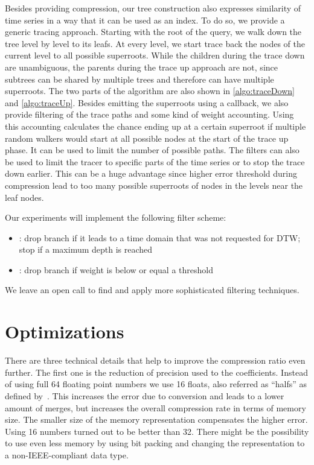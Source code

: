 Besides providing compression, our tree construction also expresses similarity of time series in a way that it can be used as an index. To do so, we provide a generic tracing approach. Starting with the root of the query, we walk down the tree level by level to its leafs. At every level, we start trace back the nodes of the current level to all possible superroots. While the children during the trace down are unambiguous, the parents during the trace up approach are not, since subtrees can be shared by multiple trees and therefore can have multiple superroots. The two parts of the algorithm are also shown in \autoref{algo:traceDown} and \autoref{algo:traceUp}. Besides emitting the superroots using a callback, we also provide filtering of the trace paths and some kind of weight accounting. Using this accounting calculates the chance ending up at a certain superroot if multiple random walkers would start at all possible nodes at the start of the trace up phase. It can be used to limit the number of possible paths. The filters can also be used to limit the tracer to specific parts of the time series or to stop the trace down earlier. This can be a huge advantage since higher error threshold during compression lead to too many possible superroots of nodes in the levels near the leaf nodes.

Our experiments will implement the following filter scheme:

\begin{itemize}
    \item {}: drop branch if it leads to a time domain that was not requested for DTW\@; stop if a maximum depth is reached
    \item {}: drop branch if weight is below or equal a threshold
\end{itemize}

We leave an open call to find and apply more sophisticated filtering techniques.



\section{Optimizations}
\label{sec:algorithm:opt}

There are three technical details that help to improve the compression ratio even further. The first one is the reduction of precision used to the coefficients. Instead of using full \SI{64}{\bit} floating point numbers we use \SI{16}{\bit} floats, also referred as \enquote{halfs} as defined by~\cite{ieee_float}. This increases the error due to conversion and leads to a lower amount of merges, but increases the overall compression rate in terms of memory size. The smaller size of the memory representation compensates the higher error. Using \SI{16}{\bit} numbers turned out to be better than \SI{32}{\bit}. There might be the possibility to use even less memory by using bit packing and changing the representation to a non-IEEE-compliant data type.


